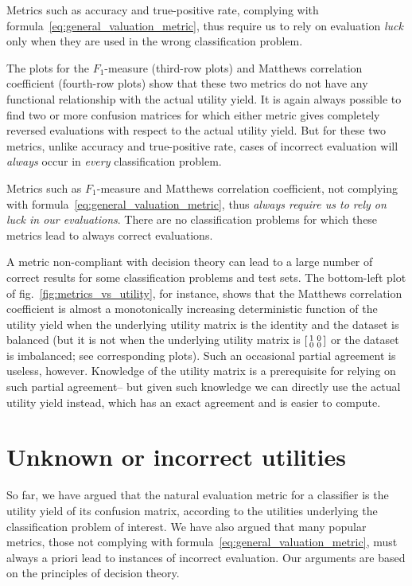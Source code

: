 \documentclass[\ifafour a4paper,12pt,\else a5paper,10pt,\fi%
onecolumn,oneside,article,%
british%
]{memoir}
\theoremstyle{remark}
\theoremstyle{innote}
\renewcommand*{\|}[1][]{\nonscript\:#1\vert\nonscript\:\mathopen{}}
\newcommand*{\fig}{fig.}%
\newcommand*{\sumatrix}[4]{\begin{bsmallmatrix*}[r]#1&#2\\#3&#4\end{bsmallmatrix*}}
\begin{document}
Metrics such as accuracy and true-positive rate, complying with formula~\eqref{eq:general_valuation_metric}, thus require us to rely on evaluation \emph{luck} only when they are used in the wrong classification problem.

The plots for the $F_{1}$-measure (third-row plots) and Matthews correlation coefficient (fourth-row plots) show that these two metrics do not have any functional relationship with the actual utility yield. It is again always possible to find two or more confusion matrices for which either metric gives completely reversed evaluations with respect to the actual utility yield. But for these two metrics, unlike accuracy and true-positive rate, cases of incorrect evaluation will \emph{always} occur in \emph{every} classification problem.

Metrics such as  $F_{1}$-measure and Matthews correlation coefficient, not complying with formula~\eqref{eq:general_valuation_metric}, thus \emph{always require us to rely on luck in our evaluations}. There are no classification problems for which these metrics lead to always correct evaluations.

\medskip

A metric non-compliant with decision theory can lead to a large number of correct results for some classification problems and test sets. The bottom-left plot of \fig~\ref{fig:metrics_vs_utility}, for instance, shows that the Matthews correlation coefficient is almost a monotonically increasing deterministic function of the utility yield when the underlying utility matrix is the identity and the dataset is balanced (but it is not when the underlying utility matrix is $\sumatrix{ 1}{0}{0}{0 }$ or the dataset is imbalanced; see corresponding plots). Such an occasional partial agreement is useless, however. Knowledge of the utility matrix is a prerequisite for relying on such partial agreement-- but given such knowledge we can directly use the actual utility yield instead, which has an exact agreement and is easier to compute.


\section{Unknown or incorrect utilities}
\label{sec:unknown_wrong_utilities}

So far, we have argued that the natural evaluation metric for a classifier is the utility yield of its confusion matrix, according to the utilities underlying the classification problem of interest. We have also argued that many popular metrics, those not complying with formula~\eqref{eq:general_valuation_metric}, must always a priori lead to instances of incorrect evaluation. Our arguments are based on the principles of decision theory.
\end{document}
